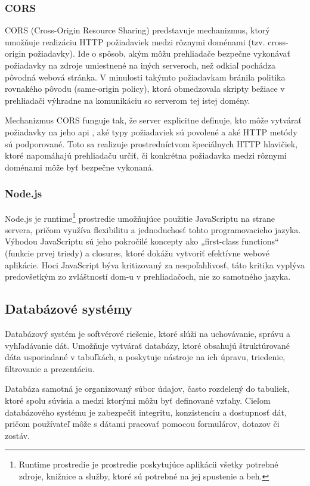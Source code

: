 \subsubsection*{CORS}
CORS (Cross-Origin Resource Sharing) predstavuje mechanizmus, ktorý umožňuje realizáciu HTTP požiadaviek medzi rôznymi doménami (tzv. cross-origin požiadavky).
 Ide o spôsob, akým môžu prehliadače bezpečne vykonávať požiadavky na zdroje umiestnené na iných serveroch, než odkiaľ pochádza pôvodná webová stránka. 
 V minulosti takýmto požiadavkam bránila politika rovnakého pôvodu (same-origin policy), ktorá obmedzovala skripty bežiace v prehliadači výhradne na komunikáciu so serverom tej istej domény.

Mechanizmus CORS funguje tak, že server explicitne definuje, kto môže vytvárať požiadavky na jeho \acrshort{api}
, aké typy požiadaviek sú povolené a aké HTTP metódy sú podporované.
 Toto sa realizuje prostredníctvom špeciálnych HTTP hlavičiek, ktoré napomáhajú prehliadaču určiť, či konkrétna požiadavka medzi rôznymi doménami môže byť bezpečne vykonaná.\cite{CORS}
\subsubsection*{Node.js}
Node.js je runtime\footnote{Runtime prostredie je prostredie poskytujúce aplikácii všetky potrebné zdroje, knižnice a služby, ktoré sú potrebné na jej spustenie a beh.}
prostredie umožňujúce použitie JavaScriptu na strane servera, pričom využíva flexibilitu a jednoduchosť tohto programovacieho jazyka.
 Výhodou JavaScriptu sú jeho pokročilé koncepty ako „first-class functions“ (funkcie prvej triedy) a closures, ktoré dokážu vytvoriť efektívne webové aplikácie. 
 Hoci JavaScript býva kritizovaný za nespoľahlivosť, táto kritika vyplýva predovšetkým zo zvláštností \acrshort{dom}-u v prehliadačoch, nie zo samotného jazyka.
 \subsection{Databázové systémy}
 Databázový systém je softvérové riešenie, ktoré slúži na uchovávanie, správu a vyhľadávanie dát. 
 Umožňuje vytvárať databázy, ktoré obsahujú štruktúrované dáta usporiadané v tabuľkách, a poskytuje nástroje na ich úpravu, triedenie, filtrovanie a prezentáciu.
 
 Databáza samotná je organizovaný súbor údajov, často rozdelený do tabuliek, ktoré spolu súvisia a medzi ktorými môžu byť definované vzťahy. 
 Cieľom databázového systému je zabezpečiť integritu, konzistenciu a dostupnosť dát, pričom používateľ môže s dátami pracovať pomocou formulárov, dotazov či zostáv.\cite{databazovesystemy}
 
